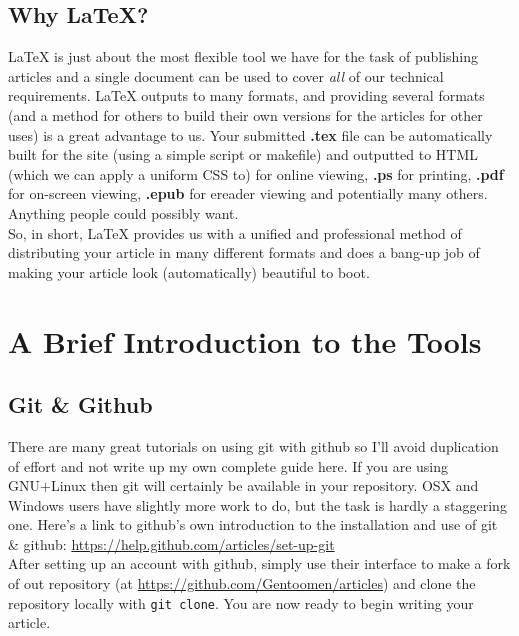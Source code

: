 \documentclass{amsart}
\begin{document}
\subsection{Why \LaTeX{}?}
 \LaTeX{} is just about the most flexible tool we have for the task of publishing articles and a single document can be used to cover \emph{all} of our technical requirements. \LaTeX{} outputs to many formats, and providing several formats (and a method for others to build their own versions for the articles for other uses) is a great advantage to us. Your submitted \textbf{.tex} file can be automatically built for the site (using a simple script or makefile) and outputted to HTML (which we can apply a uniform CSS to) for online viewing, \textbf{.ps} for printing, \textbf{.pdf} for on-screen viewing, \textbf{.epub} for ereader viewing and potentially many others. Anything people could possibly want. \\
 So, in short, \LaTeX{} provides us with a unified and professional method of distributing your article in many different formats and does a bang-up job of making your article look (automatically) beautiful to boot.

\section{A Brief Introduction to the Tools}
\subsection{Git \& Github}
  There are many great tutorials on using git with github so I'll avoid duplication of effort and not write up my own complete guide here. If you are using GNU+Linux then git will certainly be available in your repository. OSX and Windows users have slightly more work to do, but the task is hardly a staggering one. Here's a link to github's own introduction to the installation and use of git \& github: \url{https://help.github.com/articles/set-up-git} \\
  After setting up an account with github, simply use their interface to make a fork of out repository (at \url{https://github.com/Gentoomen/articles}) and clone the repository locally with \texttt{git clone}. You are now ready to begin writing your article.
\end{document}
